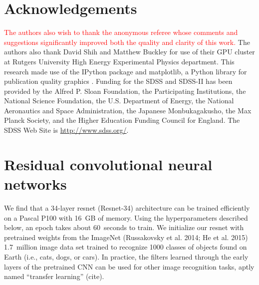 \documentclass[fleqn,usenatbib]{mnras}
\newcommand{\editorial}[1]{\textcolor{red}{#1}}
\begin{document}
\section*{Acknowledgements}
\editorial{The authors also wish to thank the anonymous referee whose comments and suggestions significantly improved both the quality and clarity of this work.}
The authors also thank David Shih and Matthew Buckley for use of their GPU cluster at Rutgers University High Energy Experimental Physics department. %
This research made use of the {\sc IPython} package \citep{Perez2007} and {\sc matplotlib}, a Python library for publication quality graphics \citep{Hunter2007}. Funding for the SDSS and SDSS-II has been provided by the Alfred P. Sloan Foundation, the Participating Institutions, the National Science Foundation, the U.S. Department of Energy, the National Aeronautics and Space Administration, the Japanese Monbukagakusho, the Max Planck Society, and the Higher Education Funding Council for England. The SDSS Web Site is \url{http://www.sdss.org/}.



\appendix
%
\section{Residual convolutional neural networks}
%



We find that a 34-layer resnet (Resnet-34) architecture can be trained efficiently on a Pascal P100 with 16~GB of memory.
Using the hyperparameters described below, an epoch takes about 60~seconds to train.
We initialize our resnet with pretrained weights from the ImageNet (Russakovsky et al. 2014; He et al. 2015) 1.7~million image data set trained to recognize 1000 classes of objects found on Earth (i.e., cats, dogs, or cars).
In practice, the filters learned through the early layers of the pretrained CNN can be used for other image recognition tasks, aptly named ``transfer learning'' (cite).
\end{document}
